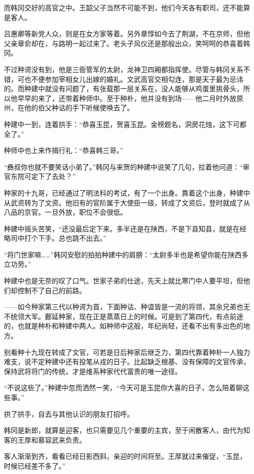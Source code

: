 而韩冈交好的高官之中。王韶父子当然不可能不到，他们今天各有职司，还不能算是客人。

吕惠卿等新党人众，则是在女方家等着。另外章惇如今去了荆湖，不在京师，但他父亲章俞却在，与路明一起过来了。老头子风仪还是那般出众，笑呵呵的恭喜着韩冈。

不过种谔没有到，他是三衙管军的太尉，龙神卫四厢都指挥使。尽管与韩冈关系不错，可也不便参加宰相女儿出嫁的婚礼。文武高官交相勾连，那是天子最为忌讳的。而种建中就没有问题了，有张载那一层关系在，没人能够从鸡蛋里挑骨头，所以他早早的来了，还带着种师中。至于种朴，他并没有到场——他二月时外放原州，在他的伯父种诂的手下听候使唤去了。

种建中一到，连着拱手：“恭喜玉昆，贺喜玉昆。金榜题名，洞房花烛，这下可都全了。”

种师中也上来作揖行礼：“恭喜韩三哥。”

“彝叔你也就不要笑话小弟了。”韩冈与来贺的种建中说笑了几句，拉着他问道：“审官东院可定下了去处？”

种家的十九哥，已经通过了明法科的考试，有了一个出身。靠着这个出身，种建中从武资转为了文资。他旧有的官阶属于大使臣一级，转成了文资后，登时就成了从八品的京官。一旦外放，职位不会很低。

种建中摇头苦笑，“还没最后定下来。多半还是在陕西，不是下县知县，就是在经略司中打个下手。总也跳不出去。”

“将门世家嘛……”韩冈安慰的拍拍种建中的肩膀：“太尉多半也是希望你能在陕西多立功劳。”

种建中也是无奈的叹了口气。世家子弟的仕途，先天上就比寒门中人要平坦，但他们却控制不了自己的前路。

——如今种家第三代以种谔为首，下面种诂、种谊皆是一流的将领，其余兄弟也无不统领大军。鄜延种家，现在正是蒸蒸日上的时候。可是到了第四代，有点前途的，也就是种朴和种建中两人。如种师中这般，年纪尚轻，还看不出有多出色的地方。

别看种十九现在转成了文官，可若是日后种家后继乏力，第四代靠着种朴一人独力难支，说不定种建中还有投笔从戎的日子。比起缺乏根基、没有保障的文官传承，保持武将将门的传统，才是维系种家代代富贵的唯一途径。

“不说这些了。”种建中忽而洒然一笑，“今天可是玉昆你大喜的日子，怎么陪着聊这些事。”

拱了拱手，自去与其他认识的朋友打招呼。

韩冈是新郎，就算是迎客，也只需要见几个重要的主宾，至于闲散客人，由代为知客的王厚和慕容武来负责。

客人渐渐到齐，看看已经日影西斜，亲迎的时间将至。王厚就过来催促，“玉昆，时候已经差不多了。”

